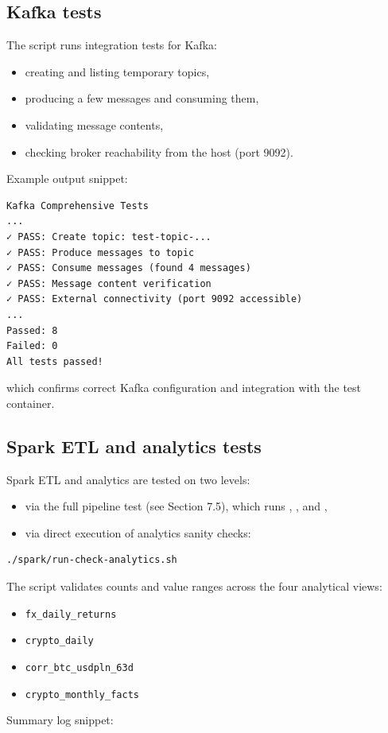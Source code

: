 \documentclass{article}
\begin{document}
\subsection{Kafka tests}

The script  runs integration tests for
Kafka:

\begin{itemize}
\item
  creating and listing temporary topics,
\item
  producing a few messages and consuming them,
\item
  validating message contents,
\item
  checking broker reachability from the host (port 9092).
\end{itemize}

Example output snippet:

\begin{lstlisting}
Kafka Comprehensive Tests
...
✓ PASS: Create topic: test-topic-...
✓ PASS: Produce messages to topic
✓ PASS: Consume messages (found 4 messages)
✓ PASS: Message content verification
✓ PASS: External connectivity (port 9092 accessible)
...
Passed: 8
Failed: 0
All tests passed!
\end{lstlisting}

which confirms correct Kafka configuration and integration with the test
container.

\subsection{Spark ETL and analytics tests}

Spark ETL and analytics are tested on two levels:

\begin{itemize}
\item
  via the full pipeline test (see Section 7.5), which runs
  , , and
  ,
\item
  via direct execution of analytics sanity checks:
\end{itemize}

\begin{lstlisting}
./spark/run-check-analytics.sh
\end{lstlisting}

The script validates counts and value ranges across the four analytical
views:
\begin{itemize}
\item \texttt{fx\_daily\_returns}
\item \texttt{crypto\_daily}
\item \texttt{corr\_btc\_usdpln\_63d}
\item \texttt{crypto\_monthly\_facts}
\end{itemize}
Summary log snippet:
\end{document}
